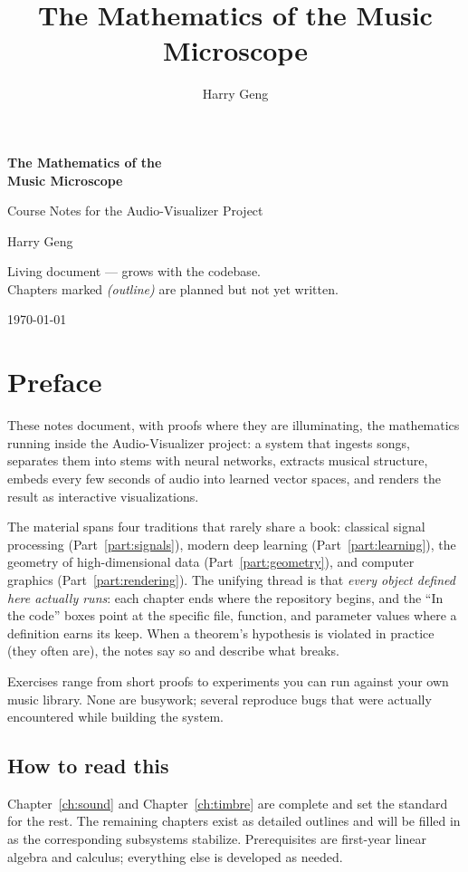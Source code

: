 \documentclass[11pt,oneside]{book}
\title{The Mathematics of the Music Microscope}
\author{Harry Geng}
\date{}
\begin{document}
\begin{titlepage}
\centering
{\Huge\bfseries The Mathematics of the\\[4pt] Music Microscope\par}
\vspace{1.2cm}
{\Large Course Notes for the Audio-Visualizer Project\par}
\vspace{2.2cm}
{\large Harry Geng\par}
\vfill
{\small Living document --- grows with the codebase.\\
Chapters marked \emph{(outline)} are planned but not yet written.\par}
\vspace{0.8cm}
{\small \today\par}
\end{titlepage}

\frontmatter
\tableofcontents

\chapter{Preface}
These notes document, with proofs where they are illuminating, the mathematics
running inside the Audio-Visualizer project: a system that ingests songs,
separates them into stems with neural networks, extracts musical structure,
embeds every few seconds of audio into learned vector spaces, and renders the
result as interactive visualizations.

The material spans four traditions that rarely share a book: classical signal
processing (Part~\ref{part:signals}), modern deep learning
(Part~\ref{part:learning}), the geometry of high-dimensional data
(Part~\ref{part:geometry}), and computer graphics
(Part~\ref{part:rendering}). The unifying thread is that \emph{every object
defined here actually runs}: each chapter ends where the repository begins,
and the ``In the code'' boxes point at the specific file, function, and
parameter values where a definition earns its keep. When a theorem's
hypothesis is violated in practice (they often are), the notes say so and
describe what breaks.

Exercises range from short proofs to experiments you can run against your own
music library. None are busywork; several reproduce bugs that were actually
encountered while building the system.

\section*{How to read this}
Chapter~\ref{ch:sound} and Chapter~\ref{ch:timbre} are complete and set the
standard for the rest. The remaining chapters exist as detailed outlines and
will be filled in as the corresponding subsystems stabilize. Prerequisites are
first-year linear algebra and calculus; everything else is developed as
needed.
\end{document}
